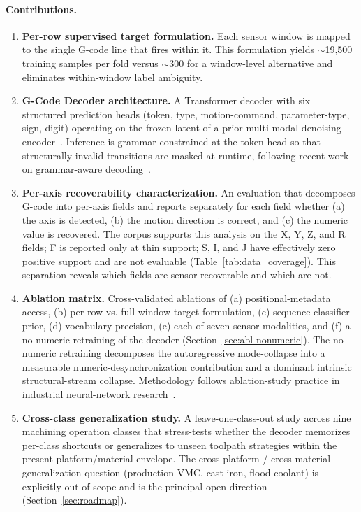 \documentclass[sensors,article,submit,moreauthors,pdftex]{Definitions/mdpi}
\newcommand{\modelname}{G-Code Decoder}
\begin{document}
\paragraph{Contributions.}
\begin{enumerate}[label=\textbf{(\arabic*)}, leftmargin=*]
\item \textbf{Per-row supervised target formulation.} Each sensor window is mapped to the single G-code line that fires within it. This formulation yields $\sim$19{,}500 training samples per fold versus $\sim$300 for a window-level alternative and eliminates within-window label ambiguity.

\item \textbf{\modelname{} architecture.} A Transformer decoder with six structured prediction heads (token, type, motion-command, parameter-type, sign, digit) operating on the frozen latent of a prior multi-modal denoising encoder~\cite{encoder_paper}. Inference is grammar-constrained at the token head so that structurally invalid transitions are masked at runtime, following recent work on grammar-aware decoding~\cite{picard,outlines,xgrammar}.

\item \textbf{Per-axis recoverability characterization.} An evaluation that decomposes G-code into per-axis fields and reports separately for each field whether (a) the axis is detected, (b) the motion direction is correct, and (c) the numeric value is recovered. The corpus supports this analysis on the X, Y, Z, and R fields; F is reported only at thin support; S, I, and J have effectively zero positive support and are not evaluable (Table~\ref{tab:data_coverage}). This separation reveals which fields are sensor-recoverable and which are not.

\item \textbf{Ablation matrix.} Cross-validated ablations of (a) positional-metadata access, (b) per-row vs. full-window target formulation, (c) sequence-classifier prior, (d) vocabulary precision, (e) each of seven sensor modalities, and (f) a no-numeric retraining of the decoder (Section~\ref{sec:abl-nonumeric}). The no-numeric retraining decomposes the autoregressive mode-collapse into a measurable numeric-desynchronization contribution and a dominant intrinsic structural-stream collapse. Methodology follows ablation-study practice in industrial neural-network research~\cite{meyes2019ablation,jia2016deep}.

\item \textbf{Cross-class generalization study.} A leave-one-class-out study across nine machining operation classes that stress-tests whether the decoder memorizes per-class shortcuts or generalizes to unseen toolpath strategies within the present platform/material envelope. The cross-platform / cross-material generalization question (production-VMC, cast-iron, flood-coolant) is explicitly out of scope and is the principal open direction (Section~\ref{sec:roadmap}).


\end{enumerate}
\end{document}
